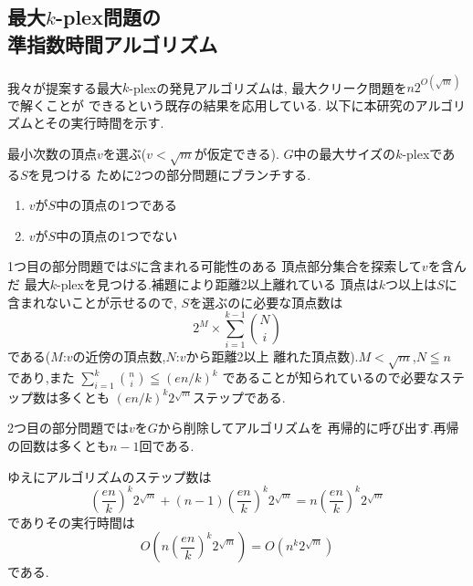 \documentclass[a4j,twoside]{jarticle}
\begin{document}
\begin{論文概要}
\section{最大$k$-plex問題の \\ 準指数時間アルゴリズム}
我々が提案する最大$k$-plexの発見アルゴリズムは,
最大クリーク問題を$n2^{O(\sqrt{m})}$で解くことが
できるという既存の結果を応用している. \cite{fomin2010exact}
以下に本研究のアルゴリズムとその実行時間を示す.

最小次数の頂点$v$を選ぶ($v<\sqrt{m}$が仮定できる).
$G$中の最大サイズの$k$-plexである$S$を見つける
ために2つの部分問題にブランチする.
\begin{enumerate}
 \item $v$が$S$中の頂点の1つである
 \item $v$が$S$中の頂点の1つでない
\end{enumerate}

1つ目の部分問題では$S$に含まれる可能性のある
頂点部分集合を探索して$v$を含んだ
最大$k$-plexを見つける.補題により距離2以上離れている
頂点は$k$つ以上は$S$に含まれないことが示せるので,
$S$を選ぶのに必要な頂点数は
\[ 2^{M} \times  \sum_{i = 1}^{k - 1}\binom{N}{i}  \]
である($M$:$v$の近傍の頂点数,$N$:$v$から距離2以上
離れた頂点数).$M < \sqrt{m}$,$N \leqq n$ であり,また 
$ \sum_{i = 1}^{k}\binom{n}{i} \leqq ({en}/{k})^{k}$
であることが知られているので必要なステップ数は多くとも
$({en}/{k})^{k}2^{\sqrt{m}}$ステップである.

2つ目の部分問題では$v$を$G$から削除してアルゴリズムを
再帰的に呼び出す.再帰の回数は多くとも$n-1$回である.

ゆえにアルゴリズムのステップ数は
\[  {\left( \frac{en}{k} \right)}^{k}2^{\sqrt{m}} +  (n - 1){\left( \frac{en}{k} \right)}^{k}2^{\sqrt{m}} =n{\left( \frac{en}{k} \right)}^{k}2^{\sqrt{m}} \]
でありその実行時間は 
\[ O(n{\left( \frac{en}{k} \right)}^{k}2^{\sqrt{m}}) = O(n^{k}2^{\sqrt{m}}) \]
である.

\begin{comment}
\section{まとめと今後の課題}
今回の研究によって,最大$k$-plex問題を$O(n^{k}2^{\sqrt{m}})$時間で
解くアルゴリズムを得ることができた.このアルゴリズムでは
$S$に入る可能性のない頂点も探索しているので,これを改良して
$O(n^{k}2^{\sqrt{m}})$の境界を突破できるかが今後の課題となる.
\end{comment}




\clearpage                       %
\end{論文概要}                   %
\end{document}
